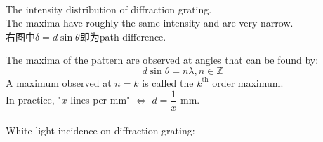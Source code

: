 \documentclass[a4paper,12pt]{article}
\begin{document}
\begin{center}
  \\
  The intensity distribution of diffraction grating. \\The maxima have roughly the same intensity and are very narrow.\\
  右图中$\delta=d\sin\theta$即为path difference.
\end{center}
The maxima of the pattern are observed at angles that can be found by:
\[d\sin\theta=n\lambda, n\in\mathbb{Z}\]
A maximum observed at $n=k$ is called the $k^\text{th}$ order maximum.\\
In practice, "$x$ lines per mm" $\Leftrightarrow$ $d=\dfrac{1}{x}$ mm.\\\\
White light incidence on diffraction grating:
\end{document}
